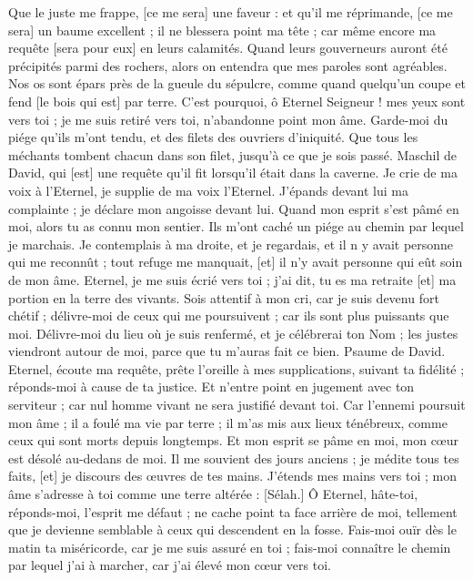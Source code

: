 \begin{multicols}{2}
Que le juste me frappe, [ce me sera] une faveur : et qu'il me réprimande, [ce me sera] un baume excellent ; il ne blessera point ma tête ; car même encore ma requête [sera pour eux] en leurs calamités.
Quand leurs gouverneurs auront été précipités parmi des rochers, alors on entendra que mes paroles sont agréables.
Nos os sont épars près de la gueule du sépulcre, comme quand quelqu'un coupe et fend [le bois qui est] par terre.
C'est pourquoi, ô Eternel Seigneur ! mes yeux sont vers toi ; je me suis retiré vers toi, n'abandonne point mon âme.
Garde-moi du piége qu'ils m'ont tendu, et des filets des ouvriers d'iniquité.
Que tous les méchants tombent chacun dans son filet, jusqu’à ce que je sois passé.
\VerseOne{}Maschil de David, qui [est] une requête qu'il fit lorsqu'il était dans la caverne. Je crie de ma voix à l'Eternel, je supplie de ma voix l'Eternel.
J'épands devant lui ma complainte ; je déclare mon angoisse devant lui.
Quand mon esprit s'est pâmé en moi, alors tu as connu mon sentier. Ils m'ont caché un piége au chemin par lequel je marchais.
Je contemplais à ma droite, et je regardais, et il n y avait personne qui me reconnût ; tout refuge me manquait, [et] il n'y avait personne qui eût soin de mon âme.
Eternel, je me suis écrié vers toi ; j'ai dit, tu es ma retraite [et] ma portion en la terre des vivants.
Sois attentif à mon cri, car je suis devenu fort chétif ; délivre-moi de ceux qui me poursuivent ; car ils sont plus puissants que moi.
Délivre-moi du lieu où je suis renfermé, et je célébrerai ton Nom ; les justes viendront autour de moi, parce que tu m'auras fait ce bien.
\VerseOne{}Psaume de David. Eternel, écoute ma requête, prête l'oreille à mes supplications, suivant ta fidélité ; réponds-moi à cause de ta justice.
Et n'entre point en jugement avec ton serviteur ; car nul homme vivant ne sera justifié devant toi.
Car l'ennemi poursuit mon âme ; il a foulé ma vie par terre ; il m'as mis aux lieux ténébreux, comme ceux qui sont morts depuis longtemps.
Et mon esprit se pâme en moi, mon cœur est désolé au-dedans de moi.
Il me souvient des jours anciens ; je médite tous tes faits, [et] je discours des œuvres de tes mains.
J'étends mes mains vers toi ; mon âme s'adresse à toi comme une terre altérée : [Sélah.]
Ô Eternel, hâte-toi, réponds-moi, l'esprit me défaut ; ne cache point ta face arrière de moi, tellement que je devienne semblable à ceux qui descendent en la fosse.
Fais-moi ouïr dès le matin ta miséricorde, car je me suis assuré en toi ; fais-moi connaître le chemin par lequel j'ai à marcher, car j'ai élevé mon cœur vers toi.

\end{multicols}
